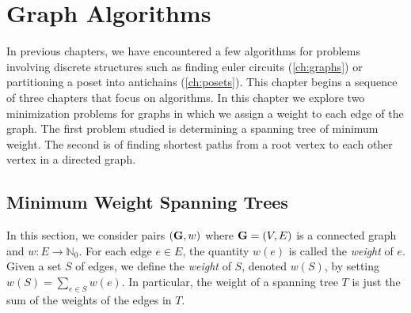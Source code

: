 
\chapter{Graph Algorithms}\label{ch:graphalgorithms}

In previous chapters, we have encountered a few algorithms for
problems involving discrete structures such as finding euler circuits
(\autoref{ch:graphs}) or partitioning a poset into antichains
(\autoref{ch:posets}). This chapter begins a sequence of three
chapters that focus on algorithms. In this chapter we explore two
minimization problems for graphs in which we assign a weight to each
edge of the graph. The first problem studied is determining a spanning
tree of minimum weight. The second is of finding shortest paths from
a root vertex to each other vertex in a directed graph.

\section{Minimum Weight Spanning Trees}\label{s:graphalgorithms:min-wt-span}

In this section, we consider pairs $(\mathbf{G},w)$ where $\mathbf{G}=(V,E)$ is a
connected graph and $w:E\rightarrow\mathbb{N}_0$. For each edge $e\in
E$, the quantity $w(e)$ is called the \textit{weight} of $e$.  Given a
set $S$ of edges, we define the \textit{weight} of $S$, denoted
$w(S)$, by setting $w(S)=\sum_{e\in S} w(e)$. In particular, the
weight of a spanning tree $T$ is just the sum of the weights of the
edges in $T$.

